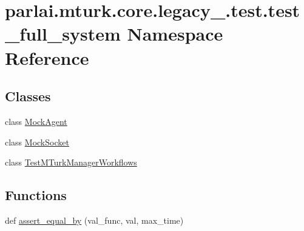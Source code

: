 \hypertarget{namespaceparlai_1_1mturk_1_1core_1_1legacy__2018_1_1test_1_1test__full__system}{}\section{parlai.\+mturk.\+core.\+legacy\+\_.\+test.\+test\+\_\+full\+\_\+system Namespace Reference}
\label{namespaceparlai_1_1mturk_1_1core_1_1legacy__2018_1_1test_1_1test__full__system}
\subsection*{Classes}
\begin{DoxyCompactItemize}
\item 
class \hyperlink{classparlai_1_1mturk_1_1core_1_1legacy__2018_1_1test_1_1test__full__system_1_1MockAgent}{Mock\+Agent}
\item 
class \hyperlink{classparlai_1_1mturk_1_1core_1_1legacy__2018_1_1test_1_1test__full__system_1_1MockSocket}{Mock\+Socket}
\item 
class \hyperlink{classparlai_1_1mturk_1_1core_1_1legacy__2018_1_1test_1_1test__full__system_1_1TestMTurkManagerWorkflows}{Test\+M\+Turk\+Manager\+Workflows}
\end{DoxyCompactItemize}
\subsection*{Functions}
\begin{DoxyCompactItemize}
\item 
def \hyperlink{namespaceparlai_1_1mturk_1_1core_1_1legacy__2018_1_1test_1_1test__full__system_af8faa2b85ee3171cbb14a4ffb6696c91}{assert\+\_\+equal\+\_\+by} (val\+\_\+func, val, max\+\_\+time)
\end{DoxyCompactItemize}
